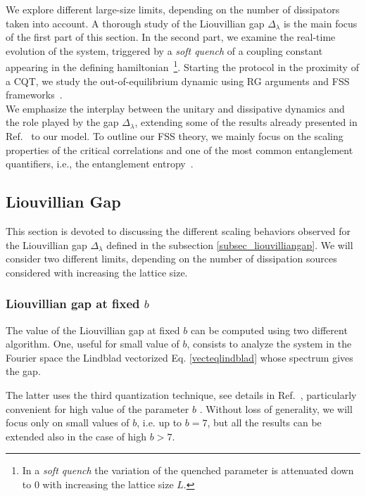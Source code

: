 We explore different large-size limits, depending on the number of dissipators taken into account. A thorough study of the Liouvillian gap $\Delta_\lambda$ is the main focus of the first part of this section. In the second part, we examine the real-time evolution of the system, triggered by a \textit{soft quench} of a coupling constant appearing in the defining hamiltonian~\footnote{In a \textit{soft quench} the variation of the quenched parameter is attenuated down to $0$ with increasing the lattice size $L$.}. Starting the protocol in the proximity of a CQT, we study the out-of-equilibrium dynamic using RG arguments and FSS frameworks~\cite{C-1996-ScalingandRG, RV-2021-coherentanddissipativedynamicsreview}.\\

We emphasize the interplay between the unitary and dissipative dynamics and the role played by the gap $\Delta_\lambda$, extending some of the results already presented in Ref.~\cite{NRV-2019-competingdissipativeandcoherent} to our model. To outline our FSS theory, we mainly focus on the scaling properties of the critical correlations and one of the most common entanglement quantifiers, i.e., the entanglement entropy~\cite{ZMZ-2021-Renyientropiesopen}.



\subsection{Liouvillian Gap}

This section is devoted to discussing the different scaling behaviors observed for the Liouvillian gap $\Delta_\lambda$ defined in the subsection \ref{subsec_liouvilliangap}. We will consider two different limits, depending on the number of dissipation sources considered with increasing the lattice size.


\subsubsection{Liouvillian gap at fixed $b$}

The value of the Liouvillian gap at fixed $b$ can be computed using two different algorithm.
One, useful for small value of $b$, consists to analyze the system in the Fourier space 
the Lindblad vectorized Eq. \eqref{vecteqlindblad} whose spectrum gives the gap. 

The latter uses the third quantization technique, see details in 
Ref.~\cite{P-2008-thirdquantization}, particularly convenient for high value of the 
parameter $b$ \cite{franchi2023Liouvillian}. Without loss of generality, we will focus only
on small values of $b$, i.e. up to $b=7$, but all the results can be extended also in
the case of high $b>7$.\\

